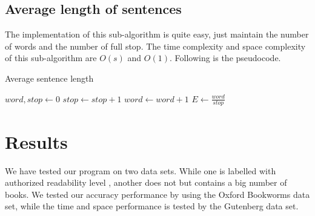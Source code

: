 \documentclass{article}
\begin{document}
        \subsection{Average length of sentences}
			The implementation of this sub-algorithm is quite easy, just maintain the number of words and the number of full stop.
			The time complexity and space complexity of this sub-algorithm are $O(s)$ and $O(1)$. Following is the pseudocode.
                \begin{center}
\begin{algorithm}[H]
\caption{Average sentence length}
                \begin{algorithmic}
                                \State $word, stop \gets 0$
                                                \State $stop \gets stop + 1$
                                        \Else
                                                        \State $word \gets word + 1$
                                                \EndIf
                                        \EndIf
                                \EndFor
                                \State \Return $E \gets \frac{word}{stop}$
                        \EndFunction
                \end{algorithmic}
\end{algorithm}
                \end{center}


\section{Results}
We have tested our program on two data sets. While one is labelled with authorized readability level \cite{oxford}, another does not but contains a big number of books. We tested our accuracy performance by using the Oxford Bookworms data set, while the time and space performance is tested by the Gutenberg data set.
\end{document}
